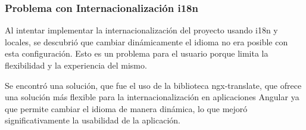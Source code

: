 \subsubsection{Problema con Internacionalización i18n}
Al intentar implementar la internacionalización del proyecto usando i18n y locales, se descubrió que cambiar dinámicamente el idioma no era posible con esta configuración. Esto es un problema para el usuario porque limita la flexibilidad y la experiencia del mismo.

Se encontró una solución, que fue el uso de la biblioteca ngx-translate, que ofrece una solución más flexible para la internacionalización en aplicaciones Angular ya que permite cambiar el idioma de manera dinámica, lo que mejoró significativamente la usabilidad de la aplicación.
